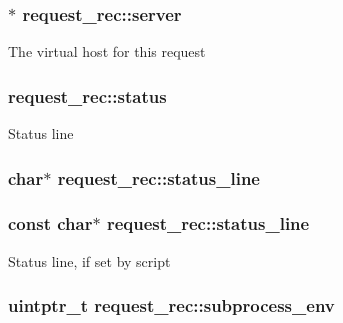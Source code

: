 \subsubsection[{\texorpdfstring{server}{server}}]{$\ast$ request\+\_\+rec\+::server}\hypertarget{structrequest__rec_adb081acb9890704af66e89d28e56e844}{}\label{structrequest__rec_adb081acb9890704af66e89d28e56e844}
The virtual host for this request 
\subsubsection[{\texorpdfstring{status}{status}}]{ request\+\_\+rec\+::status}\hypertarget{structrequest__rec_a09b59ad2fa51be73efea7369b5484eb0}{}\label{structrequest__rec_a09b59ad2fa51be73efea7369b5484eb0}
Status line 
\subsubsection[{\texorpdfstring{status\+\_\+line}{status_line}}]{\setlength{\rightskip}{0pt plus 5cm}char$\ast$ request\+\_\+rec\+::status\+\_\+line}\hypertarget{structrequest__rec_ab232130efe6c7ae07b0e0cafd49b4d31}{}\label{structrequest__rec_ab232130efe6c7ae07b0e0cafd49b4d31}
\subsubsection[{\texorpdfstring{status\+\_\+line}{status_line}}]{\setlength{\rightskip}{0pt plus 5cm}const char$\ast$ request\+\_\+rec\+::status\+\_\+line}\hypertarget{structrequest__rec_ae3f3ee341cf890566e286373f997df0b}{}\label{structrequest__rec_ae3f3ee341cf890566e286373f997df0b}
Status line, if set by script 
\subsubsection[{\texorpdfstring{subprocess\+\_\+env}{subprocess_env}}]{\setlength{\rightskip}{0pt plus 5cm}uintptr\+\_\+t request\+\_\+rec\+::subprocess\+\_\+env}\hypertarget{structrequest__rec_a36fa8def3b9cb16fe49d0b4d78099085}{}\label{structrequest__rec_a36fa8def3b9cb16fe49d0b4d78099085}
